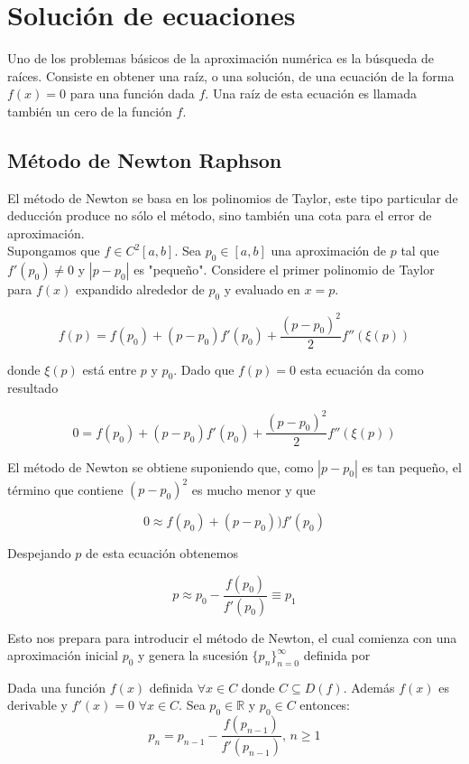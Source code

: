 \chapter{Solución de ecuaciones}
Uno de los problemas básicos de la aproximación numérica es la búsqueda de raíces. Consiste en obtener una raíz, 
o una solución, de una ecuación de la forma $f(x)=0$ para una función dada $f$. Una raíz de esta ecuación es 
llamada también un cero de la función $f$. 

\section{Método de Newton Raphson}
El método de Newton se basa en los polinomios de Taylor, este tipo particular de deducción produce no sólo el método, 
sino también una cota para el error de aproximación.\\
Supongamos que $f\in C^{2}[a, b]$. Sea $p_{0} \in [a, b]$ una aproximación de $p$ tal que $f'(p_{0}) \not= 0$ y 
$|p - p_{0}|$ es "pequeño". Considere el primer polinomio de Taylor para $f(x)$ expandido alrededor de $p_{0}$ y 
evaluado en $x=p$.

$$f(p) = f(p_{0}) + (p-p_{0})f'(p_{0}) + \frac{(p-p_{0})^{2}}{2}f''(\xi(p))$$

donde $\xi(p)$ está entre $p$ y $p_{0}$. Dado que $f(p)=0$ esta ecuación da como resultado

$$0 = f(p_{0}) + (p-p_{0})f'(p_{0}) + \frac{(p-p_{0})^{2}}{2}f''(\xi(p))$$

El método de Newton se obtiene suponiendo que, como $|p-p_{0}|$ es tan pequeño, el término que contiene $(p-p_{0})^{2}$ 
es mucho menor y que

$$0 \approx f(p_{0}) + (p-p_{0}))f'(p_{0})$$

Despejando $p$ de esta ecuación obtenemos

$$p\approx p_{0} - \frac{f(p_{0})}{f'(p_{0})} \equiv p_{1}$$

Esto nos prepara para introducir el método de Newton, el cual comienza con una aproximación inicial $p_{0}$ y genera 
la sucesión $\{ p_{n}\}_{n=0}^{\infty}$ definida por

\begin{theorem}
Dada una función $f(x)$ definida $\forall x\in C$ donde $C\subseteq D(f)$. Además $f(x)$ es derivable y $f'(x)=0$ 
$\forall x\in C$. Sea $p_0\in\mathbb{R}$ y $p_0\in C$ entonces:  
	\[p_{n} = p_{n-1} - \frac{f(p_{n-1})}{f'(p_{n-1})},\, n\geq 1\]
	\label{eq:Newton}
\end{theorem}

